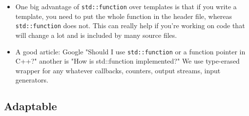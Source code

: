 \documentclass[a4paper,11pt,twoside]{book}
\begin{document}
\begin{itemize}
	\item One big advantage of \texttt{std::function} over templates is that if you write a template, you need to put the whole function in the header file, whereas \texttt{std::function} does not. This can really help if you're working on code that will change a lot and is included by many source files.
	
	\item A good article: Google "Should I use \texttt{std::function} or a function pointer in C++?" another is "How is std::function implemented?" We use type-erased wrapper for any whatever callbacks, counters, output streams, input generators.
	
\end{itemize}

\subsection{Adaptable}
\end{document}
